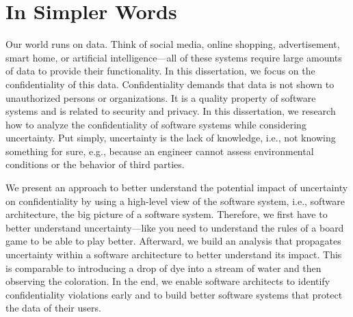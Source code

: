\section{In Simpler Words}%
\label{sec:introduction:simple}

Our world runs on data.
Think of social media, online shopping, advertisement, smart home, or artificial intelligence---all of these systems require large amounts of data to provide their functionality.
In this dissertation, we focus on the confidentiality of this data.
Confidentiality demands that data is not shown to unauthorized persons or organizations.
It is a quality property of software systems and is related to security and privacy.
In this dissertation, we research how to analyze the confidentiality of software systems while considering uncertainty.
Put simply, uncertainty is the lack of knowledge, i.e., not knowing something for sure, e.g., because an engineer cannot assess environmental conditions or the behavior of third parties.

We present an approach to better understand the potential impact of uncertainty on confidentiality by using a high-level view of the software system, i.e., software architecture, the big picture of a software system.
Therefore, we first have to better understand uncertainty---like you need to understand the rules of a board game to be able to play better.
Afterward, we build an analysis that propagates uncertainty within a software architecture to better understand its impact.
This is comparable to introducing a drop of dye into a stream of water and then observing the coloration.
In the end, we enable software architects to identify confidentiality violations early and to build better software systems that protect the data of their users.
